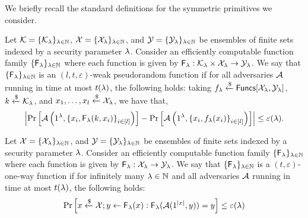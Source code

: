 We briefly recall the standard definitions for the symmetric primitives we consider.

\begin{definition}
Let $\mathcal{K} = \{\mathcal{K}_\lambda\}_{\lambda \in \mathbb{N}}$, $\mathcal{X} = \{\mathcal{X}_\lambda\}_{\lambda \in \mathbb{N}}$, and $\mathcal{Y} = \{\mathcal{Y}_\lambda\}_{\lambda \in \mathbb{N}}$ be ensembles of finite sets indexed by a security parameter $\lambda$. Consider an efficiently computable function family $\{\mathsf{F}_\lambda\}_{\lambda \in \mathbb{N}}$ where each function is given by $\mathsf{F}_\lambda: \mathcal{K}_\lambda \times \mathcal{X}_\lambda \to \mathcal{Y}_\lambda$.
We say that $\{\mathsf{F}_\lambda\}_{\lambda \in \mathbb{N}}$ is an $(l, t, \varepsilon)$-weak pseudorandom function if for all adversaries $\mathcal{A}$ running in time at most $t(\lambda)$, the following holds: taking $f_\lambda \xleftarrow{\$} \mathsf{Funcs}[\mathcal{X}_\lambda, \mathcal{Y}_\lambda]$, $k \xleftarrow{\$} \mathcal{K}_\lambda$, and $x_1, \dots, x_l \xleftarrow{\$} \mathcal{X}_\lambda$, we have that,
\[
    \left|\Pr\left[ \mathcal{A}\left(1^\lambda, {\{ x_i, \mathsf{F}_\lambda(k,x_i)\}}_{i \in [l]} \right)\right]
    - \Pr\left[ \mathcal{A}\left(1^\lambda, {\{ x_i, f_\lambda(x_i)\}}_{i \in [l]}\right)\right] \right| \leq \varepsilon(\lambda).
\]
\end{definition}


\begin{definition}
Let $\mathcal{X} = \{\mathcal{X}_\lambda\}_{\lambda \in \mathbb{N}}$, and $\mathcal{Y} = \{\mathcal{Y}_\lambda\}_{\lambda \in \mathbb{N}}$ be ensembles of finite sets indexed by a security parameter $\lambda$. Consider an efficiently computable function family $\{\mathsf{F}_\lambda\}_{\lambda \in \mathbb{N}}$ where each function is given by $\mathsf{F}_\lambda: \mathcal{X}_\lambda \to \mathcal{Y}_\lambda$.
We say that $\{\mathsf{F}_\lambda\}_{\lambda \in \mathbb{N}}$ is a $(t, \varepsilon)$-one-way function if for infinitely many $\lambda \in \mathbb{N}$ and all adversaries $\mathcal{A}$ running in time at most $t(\lambda)$, the following holds:
\[
    \Pr\left[x \xleftarrow{\$} \mathcal{X}; y \gets \mathsf{F}_\lambda(x) : \mathsf{F}_\lambda(\mathcal{A}(1^{\left| {x} \right|}, y)) = y \right] \leq \varepsilon(\lambda)
\]
\end{definition}

